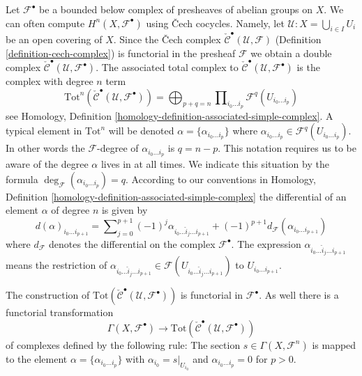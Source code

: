 \medskip\noindent
Let ${\mathcal F}^\bullet$ be a bounded below complex of presheaves of abelian
groups on $X$. We can often compute $H^n(X, {\mathcal F}^\bullet)$
using {\v C}ech cocycles. Namely, let
${\mathcal U} : X = \bigcup_{i \in I} U_i$
be an open covering of $X$. Since the {\v C}ech complex
$\check{\mathcal{C}}^\bullet(\mathcal{U}, \mathcal{F})$
(Definition \ref{definition-cech-complex})
is functorial in the presheaf $\mathcal{F}$ we obtain a double complex
$\check{\mathcal{C}}^\bullet(\mathcal{U}, \mathcal{F}^\bullet)$.
The associated total complex to
$\check{\mathcal{C}}^\bullet({\mathcal U}, {\mathcal F}^\bullet)$
is the complex with degree $n$ term
$$
\text{Tot}^n(\check{\mathcal{C}}^\bullet({\mathcal U}, {\mathcal F}^\bullet))
=
\bigoplus\nolimits_{p + q = n}
\prod\nolimits_{i_0\ldots i_p} {\mathcal F}^q(U_{i_0\ldots i_p})
$$
see
Homology, Definition \ref{homology-definition-associated-simple-complex}.
A typical element in $\text{Tot}^n$ will be denoted
$\alpha = \{\alpha_{i_0\ldots i_p}\}$ where
$\alpha_{i_0 \ldots i_p} \in \mathcal{F}^q(U_{i_0\ldots i_p})$.
In other words the $\mathcal{F}$-degree of $\alpha_{i_0\ldots i_p}$ is
$q = n - p$. This notation requires us to be aware of the degree $\alpha$
lives in at all times. We indicate this situation by the formula
$\deg_{\mathcal F}(\alpha_{i_0\ldots i_p}) = q$.
According to our conventions in
Homology, Definition \ref{homology-definition-associated-simple-complex}
the differential of an element $\alpha$ of degree $n$ is given by
$$
d(\alpha)_{i_0\ldots i_{p + 1}}
=
\sum\nolimits_{j = 0}^{p + 1}
(-1)^j \alpha_{i_0 \ldots \hat i_j \ldots i_{p + 1}} + 
(-1)^{p + 1}d_{{\mathcal F}}(\alpha_{i_0 \ldots i_{p + 1}})
$$
where $d_\mathcal{F}$ denotes the differential on the complex
$\mathcal{F}^\bullet$.
The expression $\alpha_{i_0 \ldots \hat i_j \ldots i_{p + 1}}$ means the
restriction of $\alpha_{i_0 \ldots \hat i_j \ldots i_{p + 1}}
\in {\mathcal F}(U_{i_0\ldots\hat i_j\ldots i_{p + 1}})$ to
$U_{i_0 \ldots i_{p + 1}}$.

\medskip\noindent
The construction of
$\text{Tot}(\check{\mathcal{C}}^\bullet({\mathcal U}, {\mathcal F}^\bullet))$
is functorial in ${\mathcal F}^\bullet$. As well there is a functorial
transformation
\begin{equation}
\label{equation-global-sections-to-cech}
\Gamma(X, {\mathcal F}^\bullet)
\longrightarrow
\text{Tot}(\check{\mathcal{C}}^\bullet({\mathcal U}, {\mathcal F}^\bullet))
\end{equation}
of complexes defined by the following rule: The section
$s\in \Gamma(X, {\mathcal F}^n)$
is mapped to the element $\alpha = \{\alpha_{i_0\ldots i_p}\}$
with $\alpha_{i_0} = s|_{U_{i_0}}$ and $\alpha_{i_0\ldots i_p} = 0$
for $p>0$.


